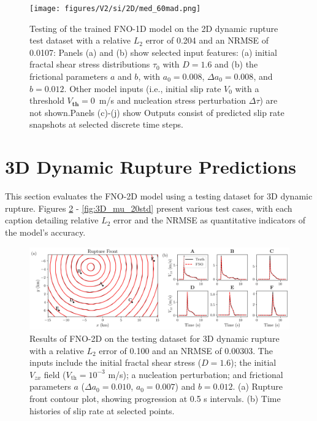 \documentclass[a4paper,11pt]{article}
\begin{document}
\begin{figure}[H]
    \centering
    \texttt{[image: figures/V2/si/2D/med\_60mad.png]}
    \caption{\label{fig:2D_mu_30std}Testing of the trained FNO-1D model on the 2D dynamic rupture test dataset with a relative \(L_2\) error of 0.204 and an NRMSE of 0.0107: Panels (a) and (b) show selected input features: (a) initial fractal shear stress distributions \(\tau_{0}\) with \(D=1.6\) and (b) the frictional parameters \(a\) and \(b\), with \(a_0 = 0.008\), \(\Delta a_0 = 0.008\), and \(b=0.012\). Other model inputs (i.e., initial slip rate \(V_0\) with  a threshold \(V_\textbf{th} = 0\)~m/s and nucleation stress perturbation \(\Delta \tau\)) are not shown.Panels (c)-(j) show Outputs consist of predicted slip rate snapshots at selected discrete time steps.}
\end{figure}


\section{3D Dynamic Rupture Predictions}
\label{sec:supp_3D}

This section evaluates the FNO-2D model using a testing dataset for 3D dynamic rupture. Figures \ref{fig:3D_mu} - \ref{fig:3D_mu_20std} present various test cases, with each caption detailing relative \(L_2\) error and the NRMSE as quantitative indicators of the model’s accuracy.

\begin{figure}[H]
    \centering
    \includegraphics[width=1.0\linewidth]{figures/V2/si/3D/1.png}
    \caption{\label{fig:3D_mu}Results of FNO-2D on the testing dataset for 3D dynamic rupture with a relative \(L_2\) error of 0.100 and an NRMSE of 0.00303. The inputs include the initial fractal shear stress (\(D = 1.6\)); the initial \(V_{zx}\) field (\(V_\text{th} = 10^{-3}\) m/s); a nucleation perturbation; and frictional parameters \(a\) (\(\Delta a_0 = 0.010\), \(a_0 = 0.007\)) and \(b = 0.012\). (a) Rupture front contour plot, showing progression at 0.5 s intervals. (b) Time histories of slip rate at selected points.
    }
\end{figure}
\end{document}
